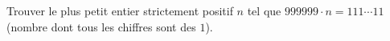 Trouver le plus petit entier strictement positif $n$ tel que $999999 \cdot n = 111\cdots11$ (nombre dont tous les chiffres sont des $1$).
